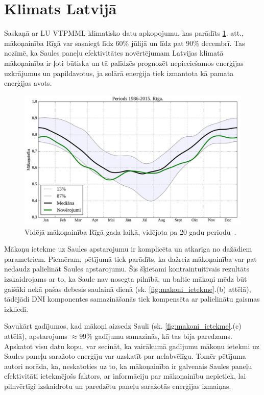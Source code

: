 \section{Klimats Latvijā}

Saskaņā ar LU VTPMML klimatisko datu apkopojumu, kas parādīts \ref{fig:makoni_Riga}. att., mākoņainība Rīgā var sasniegt līdz 60\% jūlijā un līdz pat 90\% decembrī. Tas nozīmē, ka Saules paneļu efektivitātes novērtējumam Latvijas klimatā mākoņainība ir ļoti būtiska un tā palīdzēs prognozēt nepieciešamos enerģijas uzkrājumus un papildavotus, ja solārā enerģija tiek izmantota kā pamata enerģijas avots.
\begin{figure}[h]
	\centering
	\includegraphics[width=0.8\linewidth]{figures/misc/makoni_riga.jpg}
	\caption{Vidējā mākoņainība Rīgā gada laikā, vidējota pa 20 gadu periodu~\cite{cloudsModlab}.}
	\label{fig:makoni_Riga}
\end{figure}

Mākoņu ietekme uz Saules apstarojumu ir komplicēta un atkarīga no dažādiem parametriem. Piemēram, pētījumā \cite{CloudCoverageImpactOnIrradiance} tiek parādīts, ka dažreiz mākoņainība var pat nedaudz palielināt Saules apstarojumu. Šis šķietami kontraintuitīvais rezultāts izskaidrojams ar to, ka Saule nav nosegta pilnībā, un baltie mākoņi mēdz būt gaišāki nekā pašas debesis saulainā dienā (sk. \ref{fig:makoni_ietekme}.(b) attēlā), tādējādi DNI komponentes samazināšanās tiek kompensēta ar palielinātu gaismas izkliedi. 

Savukārt gadījumos, kad mākoņi aizsedz Sauli (sk. \ref{fig:makoni_ietekme}.(c) attēlā), apstarojums $\approx99\%$ gadījumu samazinās, kā tas bija paredzams.
Apskatot visu datu kopu, var secināt, ka vairākumā gadījumu mākoņu ietekmi uz Saules paneļu saražoto enerģiju var uzskatīt par nelabvēlīgu. Tomēr pētījuma autori norāda, ka, neskatoties uz to, ka mākoņainība ir galvenais Saules paneļu efektivitāti ietekmējošs faktors, ar informāciju par mākoņainību nepietiek, lai pilnvērtīgi izskaidrotu un paredzētu paneļu saražotās enerģijas izmaiņas.

